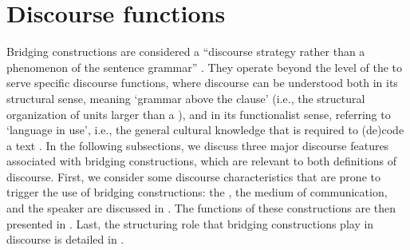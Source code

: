 \documentclass[output=paper]{LSP/langsci}
\begin{document}
\section{Discourse functions}\label{sec:guerin:4}
\label{GuAi4discourse}
Bridging constructions are considered a ``discourse strategy rather than a phenomenon of the sentence grammar'' \citep[][364]{devries.2005}. They operate beyond the level of the  to serve specific discourse functions, where discourse can be understood both in its structural sense, meaning `grammar above the clause' (i.e., the structural organization of units larger than a ), and in its functionalist sense, referring to `language in use', i.e., the general cultural knowledge that is required to (de)code a text \citep[][10--13]{cameron01}. In the following subsections, we discuss three major discourse features associated with bridging constructions, which are relevant to both definitions of discourse. First, we consider some discourse characteristics that are prone to trigger the use of bridging constructions: the , the medium of communication, and the speaker are discussed in . The  functions of these constructions are then presented in . Last, the structuring role that bridging constructions play in discourse is detailed in . 
\end{document}
